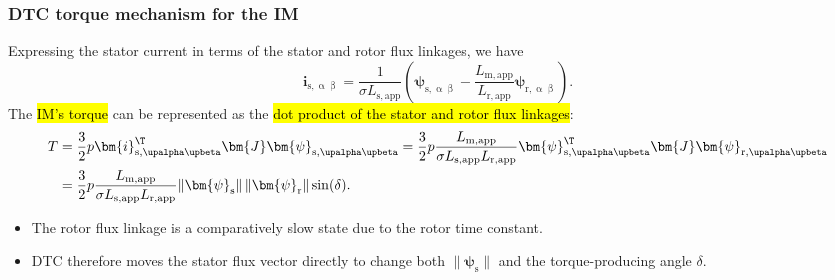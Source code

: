 \begin{frame}
    \frametitle{DTC torque mechanism for the IM}
    Expressing the stator current in terms of the stator and rotor flux linkages, we have
    \begin{equation}
        \bm{i}_{\mathrm{s},\upalpha\upbeta}
        =\frac{1}{\sigma L_\mathrm{s,app}}\left(\bm{\psi}_{\mathrm{s},\upalpha\upbeta}
        -\frac{L_\mathrm{m,app}}{L_\mathrm{r,app}}\bm{\psi}_{\mathrm{r},\upalpha\upbeta}\right).
        \label{eq:IM_DTC_stator_current_flux_relation_v2}
    \end{equation}\pause%
    The \hl{IM's torque} can be represented as the \hl{dot product of the stator and rotor flux linkages}:
    \begin{equation}
        \begin{split}
            T & = \frac{3}{2}p \bm{i}^{\T}_{\mathrm{s},\upalpha\upbeta}\bm{J}\bm{\psi}_{\mathrm{s},\upalpha\upbeta}
            = \frac{3}{2}p\frac{L_\mathrm{m,app}}{\sigma L_\mathrm{s,app}L_\mathrm{r,app}}
            \bm{\psi}_{\mathrm{s},\upalpha\upbeta}^{\T}\bm{J}\bm{\psi}_{\mathrm{r},\upalpha\upbeta}                 \\
              & = \frac{3}{2}p\frac{L_\mathrm{m,app}}{\sigma L_\mathrm{s,app}L_\mathrm{r,app}}
            \|\bm{\psi}_\mathrm{s}\|\,\|\bm{\psi}_\mathrm{r}\|\sin(\delta).
        \end{split}
        \label{eq:IM_DTC_torque_flux_angle_v2}
    \end{equation}\pause%
    \begin{itemize}
        \item The rotor flux linkage is a comparatively slow state due to the rotor time constant.\pause%
        \item DTC therefore moves the stator flux vector directly to change both $\|\bm{\psi}_\mathrm{s}\|$ and the torque-producing angle $\delta$.
    \end{itemize}
\end{frame}

